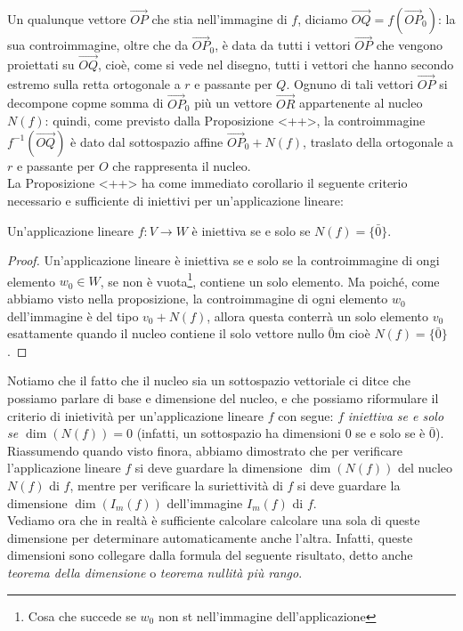 Un qualunque vettore $\vec{OP}$ che stia nell'immagine di $f$, diciamo $\vec{OQ}=f(\vec{OP}_0)$:
la sua controimmagine, oltre che da $\vec{OP}_0$, è data da tutti i vettori $\vec{OP}$ che
vengono proiettati su $\vec{OQ}$, cioè, come si vede nel disegno, tutti i vettori che hanno
secondo estremo sulla retta ortogonale a $r$ e passante per $Q$.
\clearpage
Ognuno di tali vettori $\vec{OP}$ si decompone copme somma di $\vec{OP}_0$ più un vettore
$\vec{OR}$ appartenente al nucleo $N(f)$: quindi, come previsto dalla Proposizione <++>, la
controimmagine $f^{-1}(\vec{OQ})$ è dato dal sottospazio affine $\vec{OP}_0+N(f)$, traslato
della ortogonale a $r$ e passante per $O$ che rappresenta il nucleo.\\
La Proposizione <++> ha come immediato corollario il seguente criterio necessario e sufficiente di iniettivi per
un'applicazione lineare:
\begin{corollario}
  Un'applicazione lineare $f:V\to W$ è iniettiva se e solo se $N(f)=\{\bar{0}\}$. 
\end{corollario}
\begin{proof}
  Un'applicazione lineare è iniettiva se e solo se la controimmagine di ongi elemento $w_0\in W$, se non è
  vuota\footnote{Cosa che succede se $w_0$ non st nell'immagine dell'applicazione}, contiene un solo elemento.
  Ma poiché, come abbiamo visto nella proposizione, la controimmagine di ogni elemento $w_0$ dell'immagine è del
  tipo $v_0+N(f)$, allora questa conterrà un solo elemento $v_0$ esattamente quando il nucleo contiene il solo
  vettore nullo $\bar{0}$m cioè $N(f)=\{\bar{0}\}$.
\end{proof}
Notiamo che il fatto che il nucleo sia un sottospazio vettoriale ci ditce che possiamo parlare di base e
dimensione del nucleo, e che possiamo riformulare il criterio di inietività per un'applicazione lineare $f$ con
segue: $f$ {\it iniettiva se e solo se $\dim(N(f))=0$} (infatti, un sottospazio ha dimensioni $0$ se e solo se è
$\bar{0}$). Riassumendo quando visto finora, abbiamo dimostrato che per verificare l'applicazione lineare $f$ si
deve guardare la dimensione $\dim (N(f))$ del nucleo $N(f)$ di $f$, mentre per verificare la suriettività di $f$
si deve guardare la dimensione $\dim(I_m(f))$ dell'immagine $I_m(f)$ di $f$.\\
Vediamo ora che in realtà è sufficiente calcolare calcolare una sola di queste dimensione per determinare
automaticamente anche l'altra. Infatti, queste dimensioni sono collegare dalla formula del seguente risultato,
detto anche \textit{teorema della dimensione} o \textit{teorema nullità più rango}.
